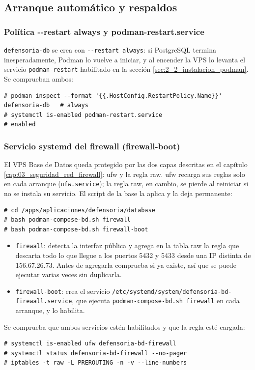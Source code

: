 \subsection{Arranque automático y respaldos}\label{sec:5_4_arranque_respaldos}

\subsubsection{Política -{}-restart always y podman-restart.service}
\texttt{defensoria-db} se crea con \texttt{-{}-restart always}: si PostgreSQL termina inesperadamente, Podman lo vuelve a iniciar, y al encender la VPS lo levanta el servicio \texttt{podman-restart} habilitado en la sección \ref{sec:2_2_instalacion_podman}. Se comprueban ambos:
\begin{lstlisting}
# podman inspect --format '{{.HostConfig.RestartPolicy.Name}}' defensoria-db   # always
# systemctl is-enabled podman-restart.service                                  # enabled
\end{lstlisting}

\subsubsection{Servicio systemd del firewall (firewall-boot)}
El VPS Base de Datos queda protegido por las dos capas descritas en el capítulo \ref{cap:03_seguridad_red_firewall}: ufw y la regla raw. ufw recarga sus reglas solo en cada arranque (\texttt{ufw.service}); la regla raw, en cambio, se pierde al reiniciar si no se instala su servicio. El script de la base la aplica y la deja permanente:
\begin{lstlisting}
# cd /apps/aplicaciones/defensoria/database
# bash podman-compose-bd.sh firewall
# bash podman-compose-bd.sh firewall-boot
\end{lstlisting}
\begin{itemize}
  \item \texttt{firewall}: detecta la interfaz pública y agrega en la tabla raw la regla que descarta todo lo que llegue a los puertos 5432 y 5433 desde una IP distinta de 156.67.26.73. Antes de agregarla comprueba si ya existe, así que se puede ejecutar varias veces sin duplicarla.
  \item \texttt{firewall-boot}: crea el servicio \nolinkurl{/etc/systemd/system/defensoria-bd-firewall.service}, que ejecuta \texttt{podman-compose-bd.sh firewall} en cada arranque, y lo habilita.
\end{itemize}
Se comprueba que ambos servicios estén habilitados y que la regla esté cargada:
\begin{lstlisting}
# systemctl is-enabled ufw defensoria-bd-firewall
# systemctl status defensoria-bd-firewall --no-pager
# iptables -t raw -L PREROUTING -n -v --line-numbers
\end{lstlisting}
